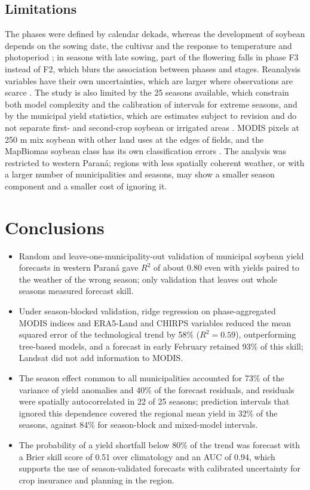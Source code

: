 \documentclass[pdflatex,sn-basic]{sn-jnl}
\begin{document}
\subsection{Limitations}\label{sec:lim}
The phases were defined by calendar dekads, whereas the development of soybean depends on the sowing date, the cultivar and the response to temperature and photoperiod \citep{CONSTABLE198857}; in seasons with late sowing, part of the flowering falls in phase F3 instead of F2, which blurs the association between phases and stages. Reanalysis variables have their own uncertainties, which are larger where observations are scarce \citep{GUALTIERI2022112741,munozsabater2021}. The study is also limited by the 25 seasons available, which constrain both model complexity and the calibration of intervals for extreme seasons, and by the municipal yield statistics, which are estimates subject to revision and do not separate first- and second-crop soybean or irrigated areas \citep{sidra}. MODIS pixels at 250 m mix soybean with other land uses at the edges of fields, and the MapBiomas soybean class has its own classification errors \citep{souza2020}. The analysis was restricted to western Paraná; regions with less spatially coherent weather, or with a larger number of municipalities and seasons, may show a smaller season component and a smaller cost of ignoring it.

\section{Conclusions}\label{sec:conc}
\begin{itemize}
\item Random and leave-one-municipality-out validation of municipal soybean yield forecasts in western Paraná gave $R^2$ of about 0.80 even with yields paired to the weather of the wrong season; only validation that leaves out whole seasons measured forecast skill.
\item Under season-blocked validation, ridge regression on phase-aggregated MODIS indices and ERA5-Land and CHIRPS variables reduced the mean squared error of the technological trend by 58\% ($R^2 = 0.59$), outperforming tree-based models, and a forecast in early February retained 93\% of this skill; Landsat did not add information to MODIS.
\item The season effect common to all municipalities accounted for 73\% of the variance of yield anomalies and 40\% of the forecast residuals, and residuals were spatially autocorrelated in 22 of 25 seasons; prediction intervals that ignored this dependence covered the regional mean yield in 32\% of the seasons, against 84\% for season-block and mixed-model intervals.
\item The probability of a yield shortfall below 80\% of the trend was forecast with a Brier skill score of 0.51 over climatology and an AUC of 0.94, which supports the use of season-validated forecasts with calibrated uncertainty for crop insurance and planning in the region.
\end{itemize}
\end{document}
